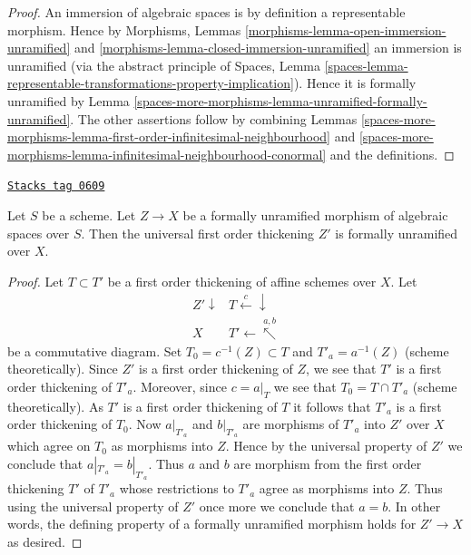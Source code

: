 \begin{proof}
An immersion of algebraic spaces is by definition a representable morphism.
Hence by
Morphisms, Lemmas \ref{morphisms-lemma-open-immersion-unramified} and
\ref{morphisms-lemma-closed-immersion-unramified}
an immersion is unramified (via the abstract principle of
Spaces, Lemma
\ref{spaces-lemma-representable-transformations-property-implication}).
Hence it is formally unramified by
Lemma \ref{spaces-more-morphisms-lemma-unramified-formally-unramified}.
The other assertions follow by combining
Lemmas \ref{spaces-more-morphisms-lemma-first-order-infinitesimal-neighbourhood} and
\ref{spaces-more-morphisms-lemma-infinitesimal-neighbourhood-conormal}
and the definitions.
\end{proof}

\begin{lemma}
\label{spaces-more-morphisms-lemma-universal-thickening-unramified}
\href{https://stacks.math.columbia.edu/tag/0609}{\texttt{Stacks tag 0609}}

Let $S$ be a scheme.
Let $Z \to X$ be a formally unramified morphism of algebraic spaces over $S$.
Then the universal first order thickening $Z'$ is formally
unramified over $X$.
\end{lemma}

\begin{proof}
Let $T \subset T'$ be a first order thickening of affine schemes over $X$.
Let
$$
\begin{array}{cc}Z' \downarrow & T \overset{c}{\longleftarrow}\downarrow \\ X & T' \longleftarrow\overset{a, b}{\nwarrow}\end{array}
$$
be a commutative diagram. Set $T_0 = c^{-1}(Z) \subset T$ and
$T'_a = a^{-1}(Z)$ (scheme theoretically).
Since $Z'$ is a first order thickening of $Z$, we see that $T'$
is a first order thickening of $T'_a$. Moreover, since $c = a|_T$ we see that
$T_0 = T \cap T'_a$ (scheme theoretically). As $T'$ is a first order
thickening of $T$ it follows that $T'_a$
is a first order thickening of $T_0$. Now $a|_{T'_a}$ and $b|_{T'_a}$
are morphisms of $T'_a$ into $Z'$ over $X$ which agree on $T_0$ as
morphisms into $Z$. Hence by the universal property of $Z'$ we conclude that
$a|_{T'_a} = b|_{T'_a}$. Thus $a$ and $b$ are morphism from
the first order thickening $T'$ of $T'_a$ whose restrictions to
$T'_a$ agree as morphisms into $Z$. Thus using the universal property of
$Z'$ once more we conclude that $a = b$. In other words, the defining
property of a formally unramified morphism holds for $Z' \to X$ as desired.
\end{proof}

